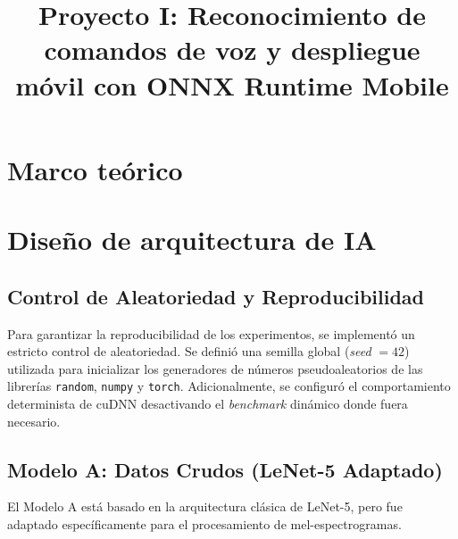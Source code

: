 \documentclass[conference]{IEEEtran}
\begin{document}
\title{Proyecto I: Reconocimiento de comandos de voz y
despliegue móvil con ONNX Runtime Mobile}

\author{
\and
{}
\and
{}
}

\maketitle

\begin{abstract}

\end{abstract}

\section{Marco teórico}

\section{Diseño de arquitectura de IA}

\subsection{Control de Aleatoriedad y Reproducibilidad}
Para garantizar la reproducibilidad de los experimentos, se implementó un estricto control de aleatoriedad. Se definió una semilla global (\textit{seed} $= 42$) utilizada para inicializar los generadores de números pseudoaleatorios de las librerías \texttt{random}, \texttt{numpy} y \texttt{torch}. Adicionalmente, se configuró el comportamiento determinista de cuDNN desactivando el \textit{benchmark} dinámico donde fuera necesario.

\subsection{Modelo A: Datos Crudos (LeNet-5 Adaptado)}
El Modelo A está basado en la arquitectura clásica de LeNet-5, pero fue adaptado específicamente para el procesamiento de mel-espectrogramas. 
\end{document}
